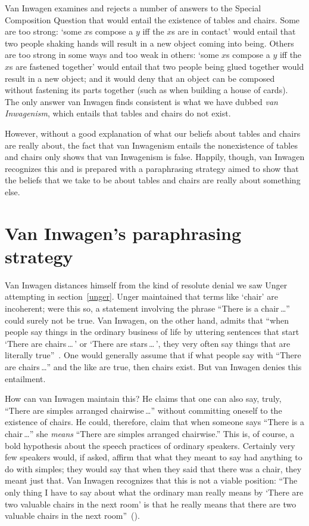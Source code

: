 \documentclass[11pt]{article}
\begin{document}
\begin{spacing}{1.5}
Van Inwagen examines and rejects a number of answers to the Special Composition Question that would entail the existence of tables and chairs. Some are too strong: `some $x$s compose a $y$ iff the $x$s are in contact' would entail that two people shaking hands will result in a new object coming into being. Others are too strong in some ways and too weak in others: `some $x$s compose a $y$ iff the $x$s are fastened together' would entail that two people being glued together would result in a new object; and it would deny that an object can be composed without fastening its parts together (such as when building a house of cards). The only answer van Inwagen finds consistent is what we have dubbed {\em van Inwagenism}, which entails that tables and chairs do not exist.

However, without a good explanation of what our beliefs about tables and chairs are really about, the fact that van Inwagenism entails the nonexistence of tables and chairs only shows that van Inwagenism is false. Happily, though, van Inwagen recognizes this and is prepared with a paraphrasing strategy aimed to show that the beliefs that we take to be about tables and chairs are really about something else.

\section{Van Inwagen's paraphrasing strategy}
\label{pigletwise}
Van Inwagen distances himself from the kind of resolute denial we saw Unger attempting in section~\ref{unger}. Unger maintained that terms like `chair' are incoherent; were this so, a statement involving the phrase ``There is a chair\,\ldots '' could surely not be true. Van Inwagen, on the other hand, admits that ``when people say things in the ordinary business of life by uttering sentences that start `There are chairs\,\ldots\,' or `There are stars\,\ldots\,', they very often say things that are literally true''~\cite[102]{inwagen1995}. One would generally assume that if what people say with ``There are chairs\,\ldots '' and the like are true, then chairs exist. But van Inwagen denies this entailment.

How can van Inwagen maintain this? He claims that one can also say, truly, ``There are simples arranged chairwise\,\ldots '' without committing oneself to the existence of chairs. He could, therefore, claim that when someone says ``There is a chair\,\ldots '' she {\em means} ``There are simples arranged chairwise.'' This is, of course, a bold hypothesis about the speech practices of ordinary speakers. Certainly very few speakers would, if asked, affirm that what they meant to say had anything to do with simples; they would say that when they said that there was a chair, they meant just that. Van Inwagen recognizes that this is not a viable position: ``The only thing I have to say about what the ordinary man really means by `There are two valuable chairs in the next room' is that he really means that there are two valuable chairs in the next room''~(\citeyear[106]{inwagen1995}).


\end{spacing}
\end{document}
